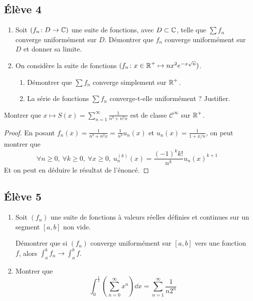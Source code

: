 \documentclass[10pt]{scrartcl}
\begin{document}
    \subsection*{Élève 4}
    \begin{ccp}
        \begin{enumerate}
            \item Soit $(f_n\colon D\to\operatorname{\mathbb C})$ une suite de fonctions, avec $D\subset \operatorname{\mathbb C}$, telle que $\sum f_n$ converge uniformément sur $D$. 
            Démontrer que $f_n$ converge uniformément sur $D$ et donner sa limite.
            \item On considère la suite de fonctions $(f_n\colon x\in\operatorname{\mathbb R}^+\mapsto nx^2e^{-x\sqrt n})$.
            \begin{enumerate}
                \item Démontrer que $\sum f_n$ converge simplement sur $\operatorname{\mathbb R}^+$.
                \item La série de fonctions $\sum f_n$ converge-t-elle uniformément ? Justifier.
            \end{enumerate}
        \end{enumerate}
    \end{ccp}

    \begin{exo}
        Montrer que $x\mapsto S(x)=\sum_{n=1}^\infty\frac1{n^3+n^2x}$ est de classe $\mathcal C^\infty$ sur $\operatorname{\mathbb R}^+$.
    \end{exo}

    \begin{proof}
        En posant $f_n(x)=\frac1{n^3+n^2x}=\frac1{n^3}u_n(x)$ et $u_n(x)=\frac1{1+x/n}$, on peut montrer que
        \[
            \forall n\geq 0,\ \forall k\geq0,\ \forall x\geq 0,\ u_n^{(k)}(x)=\frac{(-1)^kk!}{n^k}u_n(x)^{k+1}
        \]
        Et on peut en déduire le résultat de l'énoncé.
    \end{proof}

    \subsection*{Élève 5}
    \begin{ccp}\hfill
        \begin{enumerate}
            \item Soit $(f_n)$ une suite de fonctions à valeurs réelles définies et continues sur un segment $[a,b]$ non vide. 
            
            Démontrer que si $(f_n)$ converge uniformément sur $[a,b]$ vers une fonction $f$, alors $\int_a^bf_n\to\int_a^bf$.
            \item Montrer que
            \[
                \int_0^{\frac12}\left(\sum_{n=0}^\infty x^n\right)\dd x=\sum_{n=1}^\infty\frac1{n2^n}
            \]
        \end{enumerate}
    \end{ccp}
\end{document}
